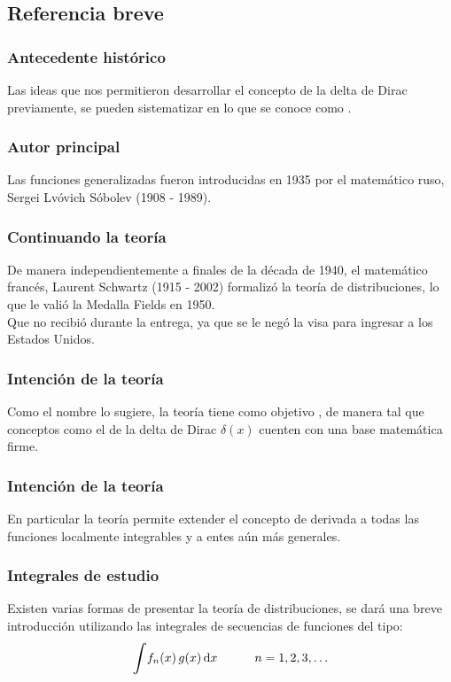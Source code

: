 \documentclass[12pt]{beamer}
\begin{document}
\subsection{Referencia breve}

\begin{frame}
\frametitle{Antecedente histórico}
Las ideas que nos permitieron desarrollar el concepto de la delta de Dirac previamente, se pueden sistematizar en lo que se conoce como .
\end{frame}

\begin{frame}
\frametitle{Autor principal}
Las funciones generalizadas fueron introducidas en 1935 por el matemático ruso, Sergei Lvóvich Sóbolev (1908 - 1989).
\end{frame}

\begin{frame}
\frametitle{Continuando la teoría}
De manera independientemente a finales de la década de 1940, el matemático francés, Laurent Schwartz (1915 - 2002) formalizó la teoría de distribuciones, \pause lo que le valió la Medalla Fields en 1950.
\\
\bigskip
\pause
Que no recibió durante la entrega, ya que se le negó la visa para ingresar a los Estados Unidos.
\end{frame}

\begin{frame}
\frametitle{Intención de la teoría}
Como el nombre lo sugiere, la teoría tiene como objetivo  , \pause de manera tal que conceptos como el de la delta de Dirac $\delta (x)$ cuenten con una base matemática firme.
\end{frame}

\begin{frame}
\frametitle{Intención de la teoría}
En particular la teoría permite extender el concepto de derivada a todas las funciones localmente integrables y a entes aún más generales.
\end{frame}

\begin{frame}
\frametitle{Integrales de estudio}
Existen varias formas de presentar la teoría de distribuciones, se dará una breve introducción utilizando las integrales de secuencias de funciones del tipo:
\pause
\begin{equation}
\scaleint{6ex} f_{n} (x) \, g (x) \dd{x} \hspace{1cm} n = 1, 2, 3 , \ldots
\label{eq:ecuacion_1_99}
\end{equation}
\end{frame}
\end{document}
